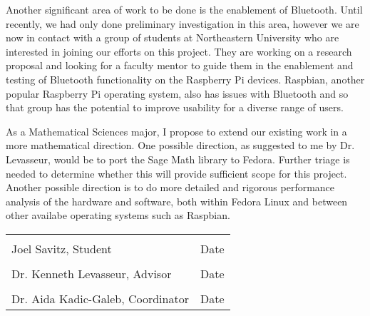 \documentclass[12pt]{amsart}
\begin{document}
Another significant area of work to be done is the enablement of Bluetooth. Until recently, we had only done preliminary investigation in this area, however we are now in contact with a group of students at Northeastern University who are interested in joining our efforts on this project. They are working on a research proposal and looking for a faculty mentor to guide them in the enablement and testing of Bluetooth functionality on the Raspberry Pi devices. Raspbian, another popular Raspberry Pi operating system, also has issues with Bluetooth and so that group has the potential to improve usability for a diverse range of users.

As a Mathematical Sciences major, I propose to extend our existing work in a more mathematical direction. One possible direction, as suggested to me by Dr. Levasseur, would be to port the Sage Math library to Fedora. Further triage is needed to determine whether this will provide sufficient scope for this project. Another possible direction is to do more detailed and rigorous performance analysis of the hardware and software, both within Fedora Linux and between other availabe operating systems such as Raspbian.

\noindent\begin{tabular}{ll}
	\\[4ex]
	\makebox[4in]{\hrulefill} & \makebox[1.5in]{\hrulefill} \\
	Joel Savitz, Student & Date \\[4ex]
	\makebox[4in]{\hrulefill} & \makebox[1.5in]{\hrulefill} \\
	Dr. Kenneth Levasseur, Advisor & Date \\[4ex]
	\makebox[4in]{\hrulefill} & \makebox[1.5in]{\hrulefill} \\
	Dr. Aida Kadic-Galeb, Coordinator & Date \\[4ex]
\end{tabular}
\end{document}
